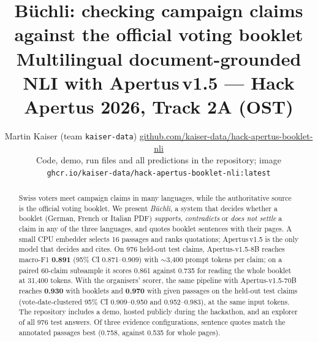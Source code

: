 \documentclass[10pt,a4paper]{article}
\title{\vspace{-1.2cm}\textbf{Büchli: checking campaign claims against the official voting booklet}\\[2pt]
  \large Multilingual document-grounded NLI with Apertus\,v1.5 --- Hack Apertus 2026, Track 2A (OST)}
\author{Martin Kaiser (team \texttt{kaiser-data}) \quad
  \href{https://github.com/kaiser-data/hack-apertus-booklet-nli}{github.com/kaiser-data/hack-apertus-booklet-nli}\\
  \small Code, demo, run files and all predictions in the repository; image
  \texttt{ghcr.io/kaiser-data/hack-apertus-booklet-nli:latest}}
\date{\vspace{-0.8cm}}
\begin{document}
\maketitle

\begin{abstract}
\noindent Swiss voters meet campaign claims in many languages, while the authoritative source is the
official voting booklet. We present \emph{Büchli}, a system that decides whether a booklet
(German, French or Italian PDF) \emph{supports}, \emph{contradicts} or \emph{does not settle} a claim
in any of the three languages, and quotes booklet sentences with their pages. A small CPU embedder
selects 16 passages and ranks quotations; Apertus\,v1.5 is the only model that decides and cites. On 976 held-out test
claims, Apertus-v1.5-8B reaches macro-F1 \textbf{0.891} (95\% CI 0.871--0.909) with $\sim$3{,}400
prompt tokens per claim; on a paired 60-claim subsample it scores 0.861 against 0.735 for reading the
whole booklet at 31{,}400 tokens. With the organisers' scorer, the same pipeline with
Apertus-v1.5-70B reaches \textbf{0.930} with booklets and \textbf{0.970} with given passages on the
held-out test claims (vote-date-clustered 95\% CI 0.909--0.950 and 0.952--0.983), at the same input
tokens. The repository includes a demo, hosted
publicly during the hackathon, and an explorer of all 976 test answers. Of three evidence configurations, sentence quotes match the
annotated passages best (0.758, against 0.535 for whole pages).
\end{abstract}
\end{document}
